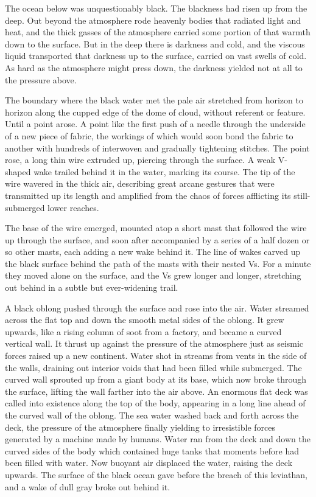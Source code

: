 \documentclass[
]{scrbook}
\begin{document}
The ocean below was unquestionably black. The blackness had risen up
from the deep. Out beyond the atmosphere rode heavenly bodies that
radiated light and heat, and the thick gasses of the atmosphere carried
some portion of that warmth down to the surface. But in the deep there
is darkness and cold, and the viscous liquid transported that darkness
up to the surface, carried on vast swells of cold. As hard as the
atmosphere might press down, the darkness yielded not at all to the
pressure above.

The boundary where the black water met the pale air stretched from
horizon to horizon along the cupped edge of the dome of cloud, without
referent or feature. Until a point arose. A point like the first push of
a needle through the underside of a new piece of fabric, the workings of
which would soon bond the fabric to another with hundreds of interwoven
and gradually tightening stitches. The point rose, a long thin wire
extruded up, piercing through the surface. A weak V-shaped wake trailed
behind it in the water, marking its course. The tip of the wire wavered
in the thick air, describing great arcane gestures that were transmitted
up its length and amplified from the chaos of forces afflicting its
still-submerged lower reaches.

The base of the wire emerged, mounted atop a short mast that followed
the wire up through the surface, and soon after accompanied by a series
of a half dozen or so other masts, each adding a new wake behind it. The
line of wakes carved up the black surface behind the path of the masts
with their nested Vs. For a minute they moved alone on the surface, and
the Vs grew longer and longer, stretching out behind in a subtle but
ever-widening trail.

A black oblong pushed through the surface and rose into the air. Water
streamed across the flat top and down the smooth metal sides of the
oblong. It grew upwards, like a rising column of soot from a factory,
and became a curved vertical wall. It thrust up against the pressure of
the atmosphere just as seismic forces raised up a new continent. Water
shot in streams from vents in the side of the walls, draining out
interior voids that had been filled while submerged. The curved wall
sprouted up from a giant body at its base, which now broke through the
surface, lifting the wall farther into the air above. An enormous flat
deck was called into existence along the top of the body, appearing in a
long line ahead of the curved wall of the oblong. The sea water washed
back and forth across the deck, the pressure of the atmosphere finally
yielding to irresistible forces generated by a machine made by humans.
Water ran from the deck and down the curved sides of the body which
contained huge tanks that moments before had been filled with water. Now
buoyant air displaced the water, raising the deck upwards. The surface
of the black ocean gave before the breach of this leviathan, and a wake
of dull gray broke out behind it.
\end{document}
